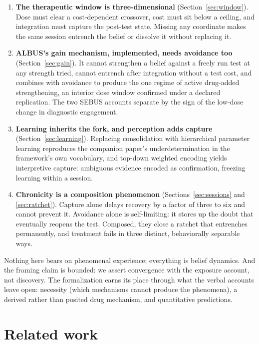 \documentclass[11pt]{article}
\begin{document}
\begin{enumerate}
  \item \textbf{The therapeutic window is three-dimensional} (Section~\ref{sec:window}).
  Dose must clear a cost-dependent crossover, cost must sit below a ceiling, and
  integration must capture the post-test state. Missing any coordinate makes the
  same session entrench the belief or dissolve it without replacing it.
  \item \textbf{ALBUS's gain mechanism, implemented, needs avoidance too}
  (Section~\ref{sec:gain}). It cannot strengthen a belief against a freely run
  test at any strength tried, cannot entrench after integration without a test
  cost, and combines with avoidance to produce the one regime of active
  drug-added strengthening, an interior dose window confirmed under a declared
  replication. The two SEBUS accounts separate by the sign of the low-dose change
  in diagnostic engagement.
  \item \textbf{Learning inherits the fork, and perception adds capture}
  (Section~\ref{sec:learning}). Replacing consolidation with hierarchical
  parameter learning reproduces the companion paper's underdetermination in the
  framework's own vocabulary, and top-down weighted encoding yields interpretive
  capture: ambiguous evidence encoded as confirmation, freezing learning within a
  session.
  \item \textbf{Chronicity is a composition phenomenon}
  (Sections~\ref{sec:sessions} and \ref{sec:ratchet}). Capture alone delays
  recovery by a factor of three to six and cannot prevent it. Avoidance alone is
  self-limiting: it stores up the doubt that eventually reopens the test.
  Composed, they close a ratchet that entrenches permanently, and treatment fails
  in three distinct, behaviorally separable ways.
\end{enumerate}

Nothing here bears on phenomenal experience; everything is belief dynamics. And
the framing claim is bounded: we assert convergence with the exposure account,
not discovery. The formalization earns its place through what the verbal accounts
leave open: necessity (which mechanisms cannot produce the phenomena), a derived
rather than posited drug mechanism, and quantitative predictions.

\section{Related work}
\label{sec:related}
\end{document}
